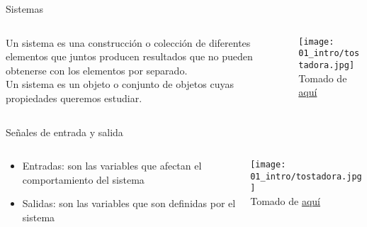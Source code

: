 \documentclass[aspectratio=169]{beamer}
\begin{document}
\begin{frame}{Sistemas}
    \begin{columns}[c, onlytextwidth]
        \begin{column}{0.4\textwidth}
        Un sistema es una construcción o colección de diferentes elementos que juntos producen resultados que no pueden obtenerse con los elementos por separado\cite{INCOSE}.\\[8pt]
        Un sistema es un objeto o conjunto de objetos cuyas propiedades queremos estudiar\cite{modelica}.
        \end{column}
        \begin{column}{0.6\textwidth}
            \begin{center}
               \texttt{[image: 01\_intro/tostadora.jpg]}\\
               \tiny{Tomado de \href{https://deseng.ryerson.ca/dokuwiki/_detail/design:toasterarchitecture.jpg?id=design\%3Asystem_diagram}{aquí}}
            \end{center}
        \end{column}
    \end{columns}
\end{frame}

\begin{frame}{Señales de entrada y salida}
    \begin{columns}[c, onlytextwidth]
        \begin{column}{0.4\textwidth}
             \begin{itemize}
                \item Entradas: son las variables que afectan el comportamiento del sistema
                \item Salidas: son las variables que son definidas por el sistema
             \end{itemize}
        \end{column}
        \begin{column}{0.6\textwidth}
            \begin{center}
               \texttt{[image: 01\_intro/tostadora.jpg]}\\
               \tiny{Tomado de \href{https://deseng.ryerson.ca/dokuwiki/_detail/design:toasterarchitecture.jpg?id=design\%3Asystem_diagram}{aquí}}
            \end{center}
        \end{column}
    \end{columns}
\end{frame}
\end{document}
